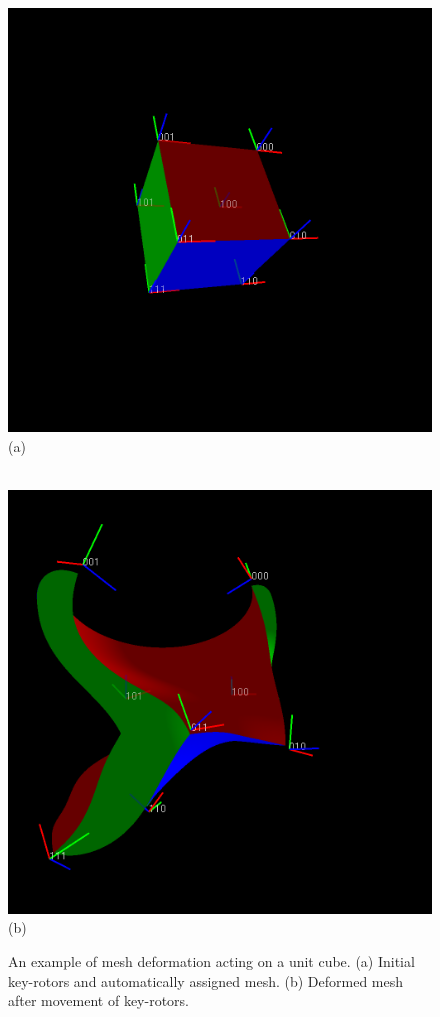 \begin{figure}[p]
\centering
\includegraphics[height=0.37\textheight]{cube_before} \\
\noindent (a) \\ \rule{0pt}{\parskip} \\
\includegraphics[height=0.37\textheight]{cube_after} \\
\noindent (b) 
\caption{\label{fig:cubeexample}An example of mesh deformation acting on a unit cube.
  (a) Initial key-rotors and automatically assigned mesh. 
  (b) Deformed mesh after movement of key-rotors.} 
\end{figure}

